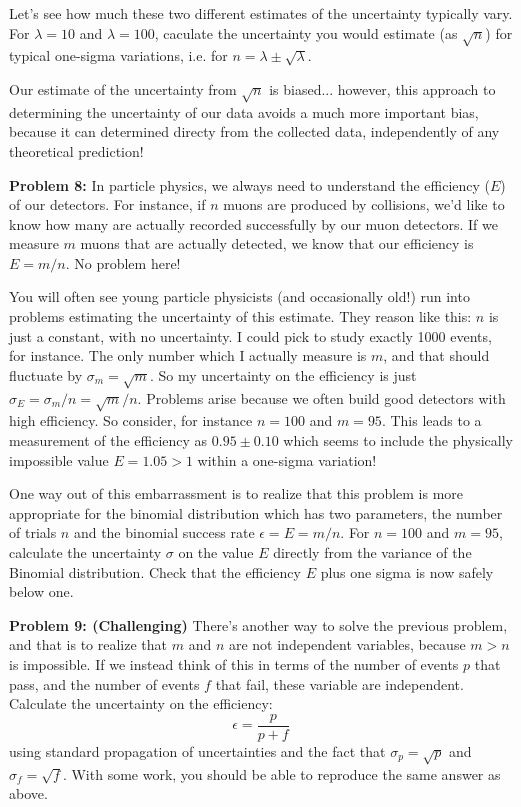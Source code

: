 \documentclass[12pt,oneside]{book}
\begin{document}
Let's see how much these two different estimates of the uncertainty
typically vary.  For $\lambda=10$ and $\lambda=100$, caculate the
uncertainty you would estimate (as $\sqrt{n}$) for typical one-sigma
variations, i.e. for $n = \lambda \pm \sqrt{\lambda}$.

Our estimate of the uncertainty from $\sqrt{n}$ is biased... however,
this approach to determining the uncertainty of our data avoids a much
more important bias, because it can determined directy from the
collected data, independently of any theoretical prediction!

\noindent
{\bf Problem 8:}  In particle physics, we always need to understand the efficiency ($E$) of our detectors.  For instance, if $n$ muons are produced by collisions, we'd like to know how many are actually recorded successfully by our muon detectors.  If we measure $m$ muons that are actually detected, we know that our efficiency is $E = m/n$.  No problem here!

You will often see young particle physicists (and occasionally old!)
run into problems estimating the uncertainty of this estimate.  They
reason like this: $n$ is just a constant, with no uncertainty.  I
could pick to study exactly 1000 events, for instance.  The only
number which I actually measure is $m$, and that should fluctuate by
$\sigma_m = \sqrt{m}$.  So my uncertainty on the efficiency is just
$\sigma_E= \sigma_m/n = \sqrt{m}/n$.  Problems arise because we often
build good detectors with high efficiency.  So consider, for instance
$n=100$ and $m=95$.  This leads to a measurement of the efficiency as
$0.95 \pm 0.10$ which seems to include the physically impossible value
$E = 1.05 > 1$ within a one-sigma variation!

One way out of this embarrassment is to realize that this problem is
more appropriate for the binomial distribution which has two
parameters, the number of trials $n$ and the binomial success rate
$\epsilon = E = m/n$.  For $n=100$ and $m=95$, calculate the uncertainty $\sigma$ on the value $E$ directly from the variance of the Binomial distribution.
Check that the efficiency $E$ plus one sigma is now safely below one.
\\ \vskip 0.25cm

\noindent
{\bf Problem 9: (Challenging)} There's another way to solve the
previous problem, and that is to realize that $m$ and $n$ are not
independent variables, because $m > n$ is impossible.  If we instead
think of this in terms of the number of events $p$ that pass, and the
number of events $f$ that fail, these variable are independent.
Calculate the uncertainty on the efficiency:
\begin{displaymath}
\epsilon = \frac{p}{p+f}
\end{displaymath}
using standard propagation of uncertainties and the fact that $\sigma_p = \sqrt{p}$ and $\sigma_f = \sqrt{f}$.  With some work, you should be able to reproduce the same answer as above. \\ \vskip 0.25cm
\end{document}
